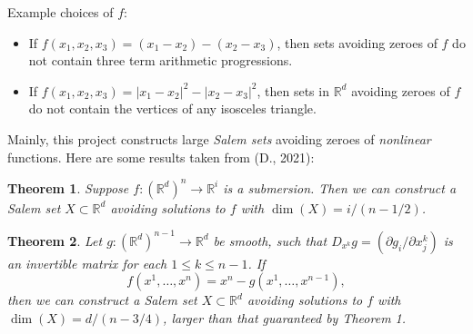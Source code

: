 \documentclass[12pt]{article}
\numberwithin{equation}{section}
\theoremstyle{plain}
\newtheorem{thm}{Theorem}
\theoremstyle{remark}
\begin{document}
{{\begin{multicols}{2}
\begin{figure}
\end{figure}

\large{ \vspace{0.2cm} Example choices of $f$:
%
\begin{itemize}
    \item If $f(x_1,x_2,x_3) = (x_1 - x_2) - (x_2 - x_3)$, then sets avoiding zeroes of $f$ do not contain three term arithmetic progressions.

    \item If $f(x_1,x_2,x_3) = |x_1 - x_2|^2 - |x_2 - x_3|^2$, then sets in $\mathbb{R}^d$ avoiding zeroes of $f$ do not contain the vertices of any isosceles triangle.
\end{itemize}

Mainly, this project constructs large \emph{Salem sets} avoiding zeroes of \emph{nonlinear} functions. Here are some results taken from (D., 2021):

\begin{thm}
    \hspace{-0.1cm} Suppose $f: (\mathbb{R}^d)^n \to \mathbb{R}^i$ is a submersion. Then we can construct a Salem set $X \subset \mathbb{R}^d$ avoiding solutions to $f$ with $\dim(X) = i / (n - 1/2)$.
\end{thm}

\begin{thm}
    Let $g: (\mathbb{R}^d)^{n-1} \to \mathbb{R}^d$ be smooth, such that $D_{x^k} g = (\partial g_i / \partial x^k_j)$ is an invertible matrix for each $1 \leq k \leq n-1$. If
    \[ f(x^1,\dots,x^n) = x^n - g(x^1,\dots,x^{n-1}), \]
    then we can construct a Salem set $X \subset \mathbb{R}^d$ avoiding solutions to $f$ with $\dim(X) = d / (n - 3/4)$, larger than that guaranteed by Theorem 1.
\end{thm}

}
\end{multicols}}}
\end{document}
